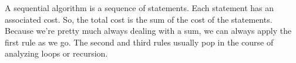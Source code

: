 \documentclass[]{tufte-handout}
\begin{document}
A sequential algorithm is a sequence of statements. Each statement has an associated cost. So, the total cost is the sum of the cost of the statements.  Because we're pretty much always dealing with a sum, we can always apply the first rule as we go. The second and third rules usually pop in the course of analyzing loops or recursion. 
\end{document}
